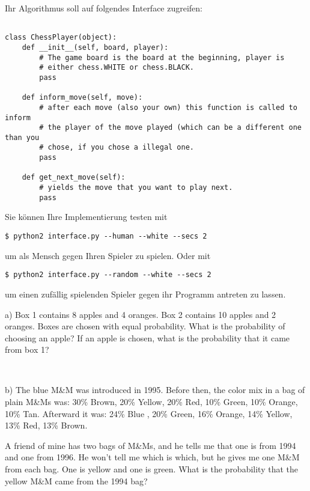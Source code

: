 Ihr Algorithmus soll auf  folgendes Interface zugreifen:
{\small
\begin{verbatim}

class ChessPlayer(object):
    def __init__(self, board, player):
        # The game board is the board at the beginning, player is
        # either chess.WHITE or chess.BLACK.
        pass

    def inform_move(self, move):
        # after each move (also your own) this function is called to inform 
        # the player of the move played (which can be a different one than you
        # chose, if you chose a illegal one.
        pass

    def get_next_move(self):
        # yields the move that you want to play next.
        pass

\end{verbatim}
}

Sie können Ihre Implementierung testen mit

{\small\verb+$ python2 interface.py --human --white --secs 2+}

um als Mensch gegen Ihren Spieler zu spielen. Oder mit

{\small\verb+$ python2 interface.py --random --white --secs 2+}

um einen zufällig spielenden Spieler gegen ihr Programm antreten zu lassen.



a) Box 1 contains 8 apples and 4 oranges. Box 2 contains 10 apples and 2
oranges. Boxes are chosen with equal probability. What is the
probability of choosing an apple? If an apple is chosen, what is the
probability that it came from box 1?

~

b) The blue M\&M was introduced in 1995.
Before then, the color mix in a bag of plain M\&Ms was:
30\% Brown, 20\% Yellow, 20\% Red, 10\% Green, 10\% Orange, 10\% Tan.
Afterward it was: 24\% Blue , 20\% Green, 16\% Orange, 14\% Yellow, 13\% Red,
13\% Brown.

A friend of mine has two bags of M\&Ms, and he tells me that one is from
1994 and one from 1996.  He won't tell me which is which, but he gives me
one M\&M from each bag.  One is yellow and one is green.  What is the
probability that the yellow M\&M came from the 1994 bag?

~

